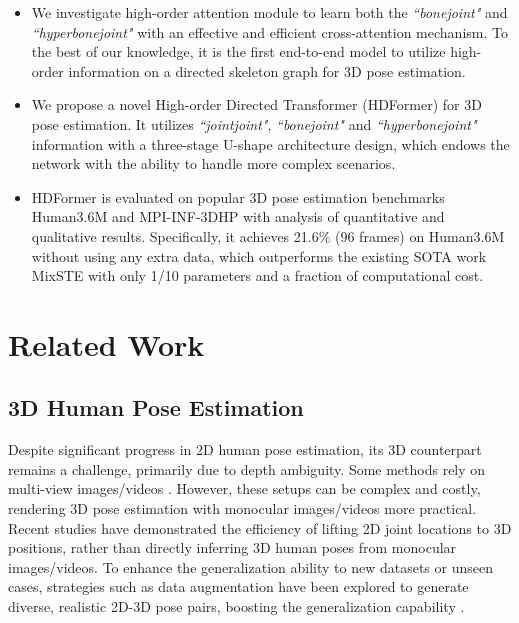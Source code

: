 \documentclass{article}
\begin{document}
\begin{itemize}[leftmargin=*]
\item We investigate high-order attention module to learn both the \textit{``bonejoint"} and \textit{``hyperbonejoint"} with an effective and efficient cross-attention mechanism. To the best of our knowledge, it is the first end-to-end model to utilize high-order information on a directed skeleton graph for 3D pose estimation.

\item We propose a novel High-order Directed Transformer (HDFormer) for 3D pose estimation. It utilizes \textit{``jointjoint"}, \textit{``bonejoint"} and \textit{``hyperbonejoint"} information with a three-stage U-shape architecture design, which endows the network with the ability to handle more complex scenarios.

\item HDFormer is evaluated on popular 3D pose estimation benchmarks Human3.6M and MPI-INF-3DHP with analysis of quantitative and qualitative results. Specifically, it achieves 21.6\% (96 frames) on Human3.6M without using any extra data, which outperforms the existing SOTA work MixSTE \cite{ZhangCVPR22MixSTE} with only 1/10 parameters and a fraction of computational cost.
\end{itemize}


\section{Related Work}
\subsection{3D Human Pose Estimation}
Despite significant progress in 2D human pose estimation, its 3D counterpart remains a challenge, primarily due to depth ambiguity. Some methods rely on multi-view images/videos \cite{Iskakov_2019_ICCV,Qiu_2019_ICCV,ye2022-faster,he2021db,zhao2018multi,huang2021generating}. However, these setups can be complex and costly, rendering 3D pose estimation with monocular images/videos more practical. Recent studies \cite{pavllo2019-3d,zhu2021-posegtac} have demonstrated the efficiency of lifting 2D joint locations to 3D positions, rather than directly inferring 3D human poses from monocular images/videos. 
To enhance the generalization ability to new datasets or unseen cases, strategies such as data augmentation have been explored to generate diverse, realistic 2D-3D pose pairs, boosting the generalization capability \cite{2021PoseAug,li2020-cascaded}.
\end{document}
